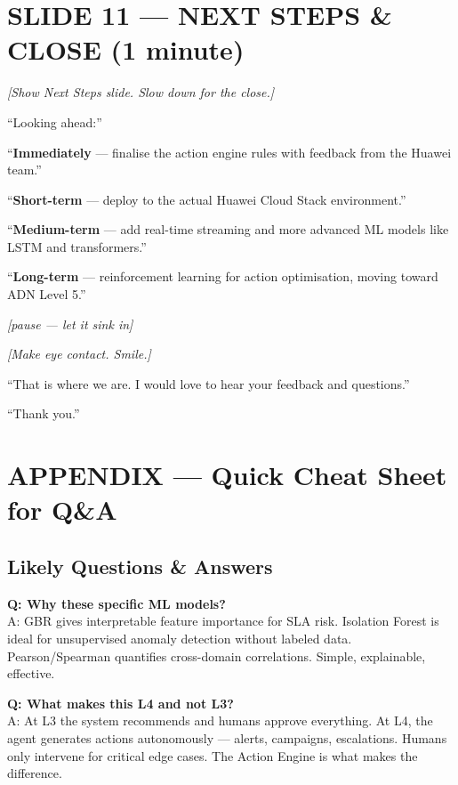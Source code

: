 \documentclass[12pt,a4paper]{article}
\newcommand{\stage}[1]{\par\textit{\color{stagedir}[#1]}\par}
\newcommand{\beat}{\par\vspace{0.4em}}
\newcommand{\pause}{\par\textit{\color{stagedir}[pause --- let it sink
            in]}\par}
\newcommand{\emphasis}[1]{\textbf{\color{huaweired}#1}}
\begin{document}
\section{SLIDE 11 --- NEXT STEPS \& CLOSE (1 minute)}

\stage{Show Next Steps slide. Slow down for the close.}

``Looking ahead:''

\beat

``\emphasis{Immediately} --- finalise the action engine rules with feedback
from the Huawei team.''

\beat

``\emphasis{Short-term} --- deploy to the actual Huawei Cloud Stack
environment.''

\beat

``\emphasis{Medium-term} --- add real-time streaming and more advanced ML
models like LSTM and transformers.''

\beat

``\emphasis{Long-term} --- reinforcement learning for action optimisation,
moving toward ADN Level 5.''

\pause

\stage{Make eye contact. Smile.}

``That is where we are. I would love to hear your feedback and questions.''

\beat

``Thank you.''

\newpage
\section{APPENDIX --- Quick Cheat Sheet for Q\&A}

\subsection{Likely Questions \& Answers}

\textbf{Q: Why these specific ML models?}\\
A: GBR gives interpretable feature importance for SLA risk. Isolation Forest is
ideal for unsupervised anomaly detection without labeled data. Pearson/Spearman
quantifies cross-domain correlations. Simple, explainable, effective.

\textbf{Q: What makes this L4 and not L3?}\\
A: At L3 the system recommends and humans approve everything. At L4, the agent
generates actions autonomously --- alerts, campaigns, escalations. Humans only
intervene for critical edge cases. The Action Engine is what makes the
difference.
\end{document}
